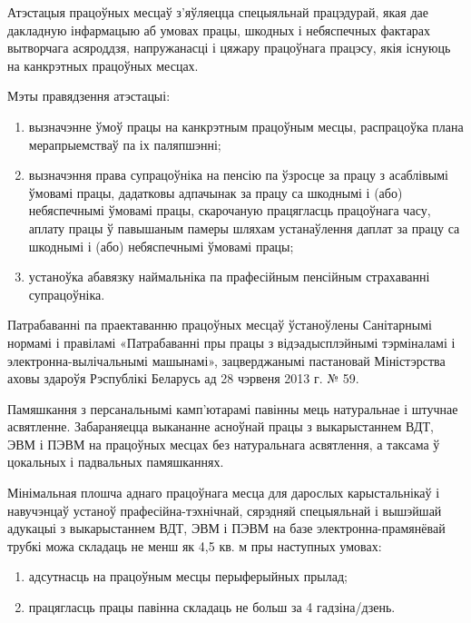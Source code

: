Атэстацыя працоўных месцаў з'яўляецца спецыяльнай працэдурай, якая дае дакладную інфармацыю аб умовах працы, шкодных і небяспечных фактарах вытворчага асяроддзя, напружанасці і цяжару працоўнага працэсу, якія існуюць на канкрэтных працоўных месцах.

Мэты правядзення атэстацыі:
\begin{enumerate}
    \item вызначэнне ўмоў працы на канкрэтным працоўным месцы, распрацоўка плана мерапрыемстваў па іх паляпшэнні;
    \item вызначэння права супрацоўніка на пенсію па ўзросце за працу з асаблівымі ўмовамі працы, дадатковы адпачынак за працу са шкоднымі і (або) небяспечнымі ўмовамі працы, скарочаную працягласць працоўнага часу, аплату працы ў павышаным памеры шляхам устанаўлення даплат за працу са шкоднымі і (або) небяспечнымі ўмовамі працы;
    \item устаноўка абавязку наймальніка па прафесійным пенсійным страхаванні супрацоўніка.
\end{enumerate}

Патрабаванні па праектаванню працоўных месцаў ўстаноўлены Санітарнымі нормамі і правіламі «Патрабаванні пры працы з відэадысплэйнымі тэрміналамі і электронна-вылічальнымі машынамі», зацверджанымі пастановай Міністэрства аховы здароўя Рэспублікі Беларусь ад 28 чэрвеня 2013 г. № 59.

Памяшкання з персанальнымі камп'ютарамі павінны мець натуральнае і штучнае асвятленне. Забараняецца выкананне асноўнай працы з выкарыстаннем ВДТ, ЭВМ і ПЭВМ на працоўных месцах без натуральнага асвятлення, а таксама ў цокальных і падвальных памяшканнях.

Мінімальная плошча аднаго працоўнага месца для дарослых карыстальнікаў і навучэнцаў устаноў прафесійна-тэхнічнай, сярэдняй спецыяльнай і вышэйшай адукацыі з выкарыстаннем ВДТ, ЭВМ і ПЭВМ на базе электронна-прамянёвай трубкі можа складаць не менш як 4,5 кв. м пры наступных умовах:
\begin{enumerate}
    \item адсутнасць на працоўным месцы перыферыйных прылад;
    \item працягласць працы павінна складаць не больш за 4 гадзіна/дзень.
\end{enumerate}

